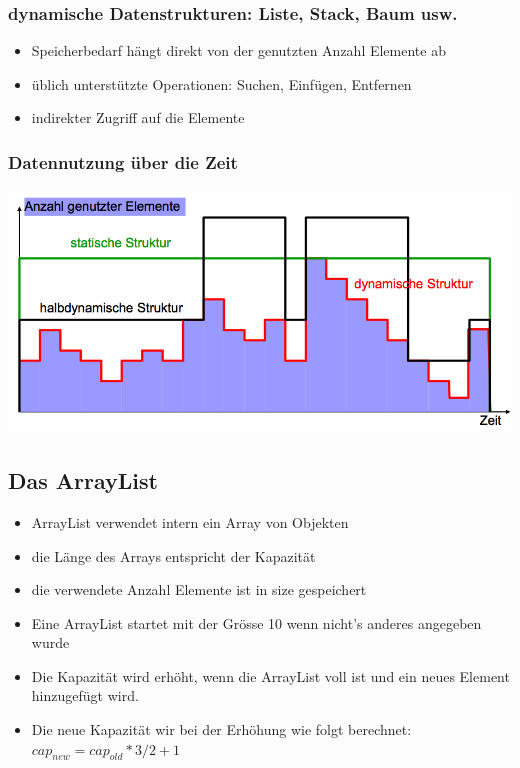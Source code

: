 \documentclass[a4paper,10pt]{article}
\begin{document}
\subsubsection{dynamische Datenstrukturen: Liste, Stack, Baum usw.}
\begin{itemize}
	\item Speicherbedarf h\"angt direkt von der genutzten Anzahl Elemente ab
	\item \"ublich unterst\"utzte Operationen: Suchen, Einf\"ugen, Entfernen
	\item indirekter Zugriff auf die Elemente
\end{itemize}

\subsubsection{Datennutzung \"uber die Zeit}
\includegraphics[width=150mm]{datennutzung_ueber_zeit.png}

\subsection{Das ArrayList}
\begin{itemize}
	\item ArrayList verwendet intern ein Array von Objekten
	\item die L\"ange des Arrays entspricht der Kapazit\"at
	\item die verwendete Anzahl Elemente ist in size gespeichert
	\item Eine ArrayList startet mit der Gr\"osse 10 wenn nicht's anderes angegeben wurde
	\item Die Kapazit\"at wird erh\"oht, wenn die ArrayList voll ist und ein neues Element hinzugef\"ugt wird.
	\item Die neue Kapazit\"at wir bei der Erh\"ohung wie folgt berechnet: $cap_{new}=cap_{old} * 3 / 2 + 1$
\end{itemize}
\end{document}
